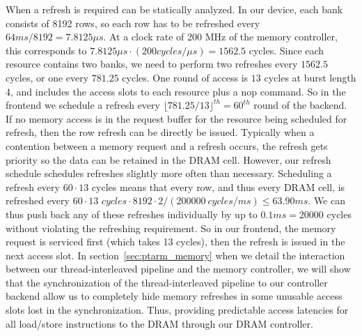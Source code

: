 When a refresh is required can be statically analyzed. 
In our device, each bank consists of 8192 rows, so each row has to be refreshed every $64\textit{ms}/8192=7.8125 {\mu}s$.
At a clock rate of 200 MHz of the memory controller, this corresponds to $7.8125 {\mu}s \cdot (200 \textit{cycles}/{\mu}s) = 1562.5$ cycles.
Since each resource contains two banks, we need to perform two refreshes every $1562.5$ cycles, or one every $781.25$ cycles.
One round of access is $13$ cycles at burst length 4, and includes the access slots to each resource plus a nop command. 
So in the frontend we schedule a refresh every $\lfloor 781.25/13 \rfloor^{th} = 60^{th}$ round of the backend.
If no memory access is in the request buffer for the resource being scheduled for refresh, then the row refresh can be directly be issued. 
Typically when a contention between a memory request and a refresh occurs, the refresh gets priority so the data can be retained in the DRAM cell. 
However, our refresh schedule schedules refreshes slightly more often than necessary.   
Scheduling a refresh every $60 \cdot 13$ cycles means that every row, and thus every DRAM cell, is refreshed every $60\cdot 13 \textit{ cycles}\cdot 8192\cdot 2/(200000~\textit{cycles}/\textit{ms}) \leq 63.90\textit{ms}$.
We can thus push back any of these refreshes individually by up to $0.1\textit{ms} = 20000$ cycles without violating the refreshing requirement.
So in our frontend, the memory request is serviced first (which takes 13 cycles), then the refresh is issued in the next access slot. 
In section~\ref{sec:ptarm_memory} when we detail the interaction between our thread-interleaved pipeline and the memory controller, we will show that the synchronization of the thread-interleaved pipeline to our controller backend allow us to completely hide memory refreshes in some unusable access slots lost in the synchronization.
Thus, providing predictable access latencies for all load/store instructions to the DRAM through our DRAM controller.



